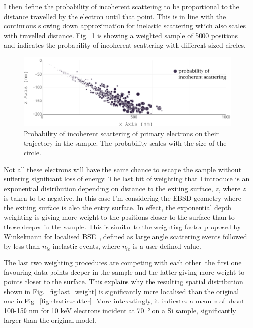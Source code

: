 I then define the probability of incoherent scattering to be proportional to the distance travelled by the electron until that point. This is in line with the continuous slowing down approximation for inelastic scattering which also scales with travelled distance. Fig.~\ref{fig:incoherentscatter} is showing a weighted sample of 5000 positions and indicates the probability of incoherent scattering with different sized circles.


\begin{figure}[ht]
\centering
\includegraphics[width=1.\linewidth]{Figures/incoherentscatter.png}
\caption[Incoherent scatter probability.]{Probability of incoherent scattering of primary electrons on their trajectory in the sample. The probability scales with the size of the circle.  }
\label{fig:incoherentscatter}
\end{figure}

Not all these electrons will have the same chance to escape the sample without suffering significant loss of energy. The last bit of weighting that I introduce is an exponential distribution depending on distance to the exiting surface, $z$, where $z$ is taken to be negative. In this case I'm considering the EBSD geometry where the exiting surface is also the entry surface. In effect, the exponential depth weighting is giving more weight to the positions closer to the surface than to those deeper in the sample. This is similar to the weighting factor proposed by Winkelmann \etal for localised BSE~\cite{Winkelmann13}, defined as large angle scattering events followed by less than $n_{ie}$ inelastic events, where $n_{ie}$ is a user defined value.

The last two weighting procedures are competing with each other, the first one favouring data points deeper in the sample and the latter giving more weight to points closer to the surface. This explains why the resulting spatial distribution shown in Fig.~\ref{fig:last_weight} is significantly more localised than the original one in Fig.~\ref{fig:elasticscatter}. More interestingly, it indicates a mean $z$ of about 100-150 nm for 10 keV electrons incident at \SI{70}{\degree} on a Si sample, significantly larger than the original model.  

